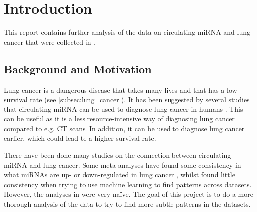 \chapter{Introduction}
\label{cha:Introduction}

\iffalse
All chapters should begin with an introduction before any sections begin. Further, each sections begins with an introduction before  subsections begin. Chapters with just one section or sections with just one sub-section, should be avoided. Think carefully about chapter and section titles as each title stand alone in the table of contents (without associated text) and should convey meaning for the contents of the chapter or section. 

In all chapters and sections it is important to write clearly and concisely. Avoid repetitions and if needed, refer back to the original discussion or presentation. Each new section, subsection or paragraph should provide the reader with new information and be written in your own words. Avoid direct quotes. If you use direct quotes, unless the quote itself is very significant, you are conveying to the reader that you are unable to express this discussion or fact yourself. Such direct quotes also break the flow of the language (yours to someone else's). 
\fi

This report contains further analysis of the data on circulating miRNA and lung cancer that were collected in \citet{forprosjekt}.

\section{Background and Motivation}
\label{sec:BackgroundAndMotivation}

Lung cancer is a dangerous disease that takes many lives and that has a low survival rate (see \autoref{subsec:lung_cancer}). It has been suggested by several studies that circulating miRNA can be used to diagnose lung cancer in humans \citep{circmeta}. This can be useful as it is a less resource-intensive way of diagnosing lung cancer compared to e.g. CT scans. In addition, it can be used to diagnose lung cancer earlier, which could lead to a higher survival rate.

There have been done many studies on the connection between circulating miRNA and lung cancer. Some meta-analyses have found some consistency in what miRNAs are up- or down-regulated in lung cancer \citep{mirna_replicate_sequences,meta-mirna-2,meta-mirna-3,meta-mirna-4}, whilst \citet{forprosjekt} found little consistency when trying to use machine learning to find patterns across datasets. However, the analyses in \citet{forprosjekt} were very naïve. The goal of this project is to do a more thorough analysis of the data to try to find more subtle patterns in the datasets.

